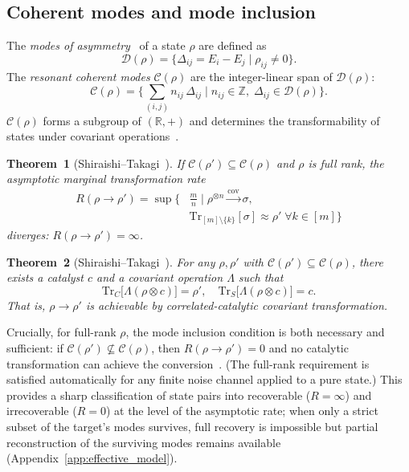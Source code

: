 \documentclass[pra,twocolumn,superscriptaddress,longbibliography,floatfix]{revtex4-2}
\begin{document}
\subsection{Coherent modes and mode inclusion}
\label{sec:modes}

The \emph{modes of asymmetry}~\cite{Lostaglio2019,Marvian2013} of a state $\rho$ are defined as
\begin{equation}
\mathcal{D}(\rho) = \bigl\{ \Delta_{ij} = E_i - E_j \mid \rho_{ij} \neq 0 \bigr\}.
\label{eq:modes}
\end{equation}
The \emph{resonant coherent modes} $\mathcal{C}(\rho)$ are the integer-linear span of $\mathcal{D}(\rho)$:
\begin{equation}
\mathcal{C}(\rho) = \biggl\{ \sum_{(i,j)} n_{ij}\, \Delta_{ij} \;\bigg|\; n_{ij} \in \mathbb{Z},\; \Delta_{ij} \in \mathcal{D}(\rho) \biggr\}.
\label{eq:resonant_modes}
\end{equation}
$\mathcal{C}(\rho)$ forms a subgroup of $(\mathbb{R}, +)$ and determines the transformability of states under covariant operations~\cite{Shiraishi2024}.

\textbf{Theorem~1} (Shiraishi--Takagi~\cite{Shiraishi2024}).
\emph{If $\mathcal{C}(\rho') \subseteq \mathcal{C}(\rho)$ and $\rho$ is full rank, the asymptotic marginal transformation rate}
\begin{equation*}
\begin{aligned}
R(\rho \to \rho') = \sup \Big\{ &\tfrac{m}{n} \mid \rho^{\otimes n} \xrightarrow{\mathrm{cov}} \sigma,\\
&\mathrm{Tr}_{[m]\setminus\{k\}}[\sigma] \approx \rho' \;\forall k \in [m] \Big\}
\end{aligned}
\end{equation*}
\emph{diverges: $R(\rho \to \rho') = \infty$.}

\textbf{Theorem~2} (Shiraishi--Takagi~\cite{Shiraishi2024}).
\emph{For any $\rho, \rho'$ with $\mathcal{C}(\rho') \subseteq \mathcal{C}(\rho)$, there exists a catalyst $c$ and a covariant operation $\Lambda$ such that}
\begin{equation}
\mathrm{Tr}_C\bigl[\Lambda(\rho \otimes c)\bigr] = \rho', \quad \mathrm{Tr}_S\bigl[\Lambda(\rho \otimes c)\bigr] = c.
\label{eq:catalytic}
\end{equation}
\emph{That is, $\rho \to \rho'$ is achievable by correlated-catalytic covariant transformation.}

Crucially, for full-rank $\rho$, the mode inclusion condition is both necessary and sufficient: if $\mathcal{C}(\rho') \not\subseteq \mathcal{C}(\rho)$, then $R(\rho \to \rho') = 0$ and no catalytic transformation can achieve the conversion~\cite{Shiraishi2024}.
(The full-rank requirement is satisfied automatically for any finite noise channel applied to a pure state.)
This provides a sharp classification of state pairs into recoverable ($R = \infty$) and irrecoverable ($R = 0$) at the level of the asymptotic rate; when only a strict subset of the target's modes survives, full recovery is impossible but partial reconstruction of the surviving modes remains available (Appendix~\ref{app:effective_model}).
\end{document}
